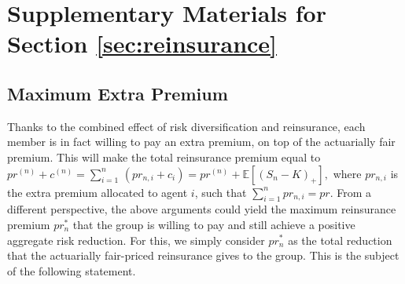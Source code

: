 \documentclass[fleqn,mnsc,nonblindrev]{informs4}
\begin{document}
\bigskip

\section{Supplementary Materials for Section \ref{sec:reinsurance}}\label{App:B}

\subsection{Maximum Extra Premium}\label{app:extra_prem}
Thanks to the combined effect of risk diversification and reinsurance, each member is in fact willing to pay an extra premium, on top of the actuarially fair premium. This will make the total reinsurance premium equal to $pr^{(n)}+c^{(n)}=\sum_{i=1}^n\, (pr_{n,i} +c_i)=pr^{(n)}+\mathbb{E}[ (S_n-K)_+],$ where $pr_{n,i}$ is the extra premium allocated to agent $i$, such that $\sum_{i=1}^n pr_{n,i}=pr$. From a different perspective, the above arguments could yield the maximum reinsurance premium $pr^*_n$ that the group is willing to pay and still achieve a positive aggregate risk reduction. For this, we simply consider $pr^*_n$ as the total reduction that the actuarially fair-priced reinsurance gives to the group. This is the subject of the following statement. 
\end{document}
